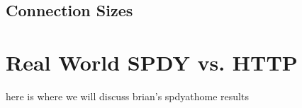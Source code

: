 \documentclass[11pt,letterpaper,notitlepage]{article}
\begin{document}
\subsection{Connection Sizes}

\section{Real World SPDY vs. HTTP}
\label{sec:realworld}
here is where we will discuss brian's spdyathome results


%



\end{document}
